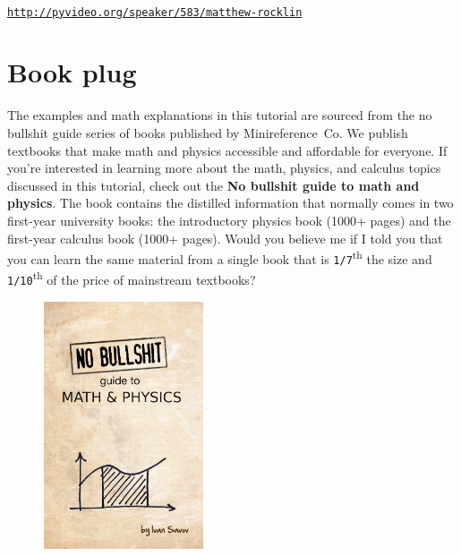 \documentclass[9pt]{IEEEtran}
\begin{document}
 \\
\href{http://pyvideo.org/speaker/583/matthew-rocklin}{\texttt{http://pyvideo.org/speaker/583/matthew-rocklin}}





\section*{Book plug}
\label{sec:book_plug}


The examples and math explanations in this tutorial are sourced from the 
{\sc no bullshit guide} series of books published by Minireference~Co.
We publish textbooks that make math and physics accessible and affordable for everyone.
If you're interested in %
learning more about the math, physics, and calculus topics discussed in this tutorial,
check out the \textbf{No bullshit guide to math and physics}.
The book contains the distilled information that normally comes in two first-year university books:
the introductory physics book (1000+ pages) and the first-year calculus book (1000+ pages).
Would you believe me if I told you that you can learn the 
same material from a single book that is \texttt{1/7}\textsuperscript{th} the size and \texttt{1/10}\textsuperscript{th} of the 
price of mainstream textbooks?

% 



\begin{figure}
\includegraphics[width=135pt,height=207pt]{figures/cover_v40_noline_lite.png}
\end{figure}
\end{document}
